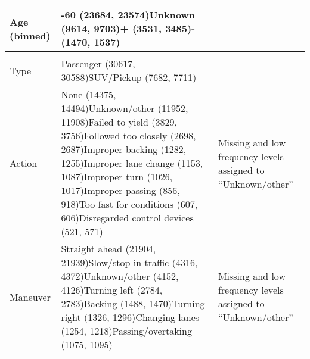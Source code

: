 \begin{tabular}{>{\raggedright\arraybackslash}p{3cm}>{\raggedright\arraybackslash}p{7cm}>{\raggedright\arraybackslash}p{4cm}}
Age (binned)      &  21-60 (23684, 23574)\newline Unknown (9614, 9703)\newline 60+ (3531, 3485)\newline 20- (1470, 1537) &     \\
\midrule


\multicolumn{3}{l}{\textbf{Vehicle}}\\\addlinespace
Type &                                                                                                                                                                                              Passenger (30617, 30588)\newline SUV/Pickup (7682, 7711) &                                                        \\

Action    &  None (14375, 14494)\newline Unknown/other (11952, 11908)\newline Failed to yield (3829, 3756)\newline Followed too closely (2698, 2687)\newline Improper backing (1282, 1255)\newline Improper lane change (1153, 1087)\newline Improper turn (1026, 1017)\newline Improper passing (856, 918)\newline Too fast for conditions (607, 606)\newline Disregarded control devices (521, 571) &                                  Missing and low frequency levels assigned to ``Unknown/other'' \\

Maneuver     &  Straight ahead (21904, 21939)\newline Slow/stop in traffic (4316, 4372)\newline Unknown/other (4152, 4126)\newline Turning left (2784, 2783)\newline Backing (1488, 1470)\newline Turning right (1326, 1296)\newline Changing lanes (1254, 1218)\newline Passing/overtaking (1075, 1095) &  Missing and low frequency levels assigned to ``Unknown/other'' \\

\bottomrule
\end{tabular}